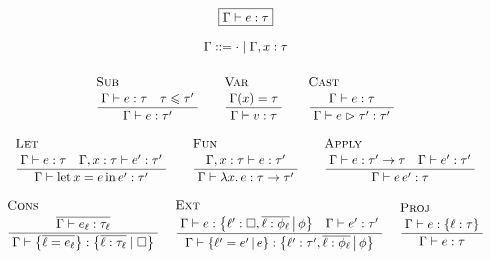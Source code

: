 $$ 
\begin{array}{c}
\boxed{\Gamma \vdash e : \tau} 
\\[0.5em]
\Gamma ::= \cdot \mid \Gamma, x : \tau
\\[1em]
\irule{Sub}{\Gamma \vdash e : \tau \quad \tau \sub \tau'}{\Gamma \vdash e : \tau'}
\quad
\irule{Var}{\Gamma(x) = \tau}{\Gamma \vdash v : \tau}
\quad 
\irule{Cast}{\Gamma \vdash e : \tau}{\Gamma \vdash \flcast e \tau' : \tau'}
\\[2em]
\irule{Let}{\Gamma \vdash e : \tau \quad \Gamma, x : \tau \vdash e' : \tau'}{\Gamma \vdash \fllet{x}{e}{e'} : \tau'}
\quad 
\irule{Fun}{\Gamma, x : \tau \vdash e : \tau'}{\Gamma \vdash \fllam{x} e : \tau \to \tau'}    
\quad 
\irule{Apply}{\Gamma \vdash e : \tau' \to \tau \quad \Gamma \vdash e' : \tau'}{\Gamma \vdash e\,e' : \tau}
\\[2em]
\irule{Cons}
    {\overline{\Gamma \vdash e_\ell : \tau_\ell}}
    {\Gamma \vdash \flrec{\overline{\ell = e_\ell}} : \flrec{\overline{\ell : \tau_\ell} \mid \flabsent}}
\;
\irule{Ext}
    {\Gamma \vdash e : \flext{\ell' : \flabsent, \overline{\ell : \phi_\ell}}{\phi} \quad \Gamma \vdash e' : \tau'}
    {\Gamma \vdash \flext{\ell' = e'}{e} : \flext{\ell' : \tau', \overline{\ell : \phi_\ell}}{\phi}}
\;
\irule{Proj}
    {\Gamma \vdash e : \flrec{ \ell : \tau }}
    {\Gamma \vdash e : \tau}
\end{array} 
$$